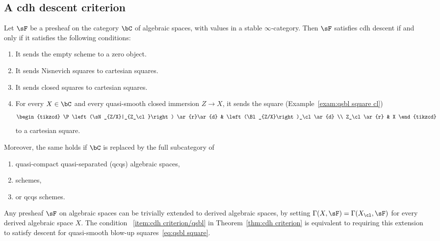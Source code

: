 \subsection{A cdh descent criterion}

\begin{theo}\label{thm:cdh criterion}
Let $\sF$ be a presheaf on the category $\bC$ of algebraic spaces, with values in a stable $\infty$-category. Then $\sF$ satisfies cdh descent if and only if it satisfies the following conditions:
\begin{enumerate}\romanenumi
\item\label{item:cdh criterion/reduced}
It sends the empty scheme to a zero object.
\item\label{item:cdh criterion/Nis}
It sends Nisnevich squares to cartesian squares.
\item\label{item:cdh criterion/closed}
It sends closed squares to cartesian squares.
\item\label{item:cdh criterion/qsbl}
For every $X\in\bC$ and every quasi-smooth closed immersion $Z \to X$, it sends the square (Example~\ref{exam:qsbl square cl})
\[
\begin{tikzcd}
\P\left(\sN_{Z/X}|_{Z_\cl}\right) \ar{r}\ar{d} & \left(\Bl_{Z/X}\right)_\cl \ar{d}
\\
Z_\cl \ar{r} & X
\end{tikzcd}
\]
to a cartesian square.
\end{enumerate} Moreover, the same holds if $\bC$ is replaced by the full subcategory of
\begin{enumerate}\alphenumi
\item quasi-compact quasi-separated (qcqs) algebraic spaces,
\item schemes,
\item or qcqs schemes.
\end{enumerate}
\end{theo}

\begin{rema}\label{rem:trivial extension to dass}
Any presheaf $\sF$ on algebraic spaces can be trivially extended to derived algebraic spaces, by setting $\Gamma(X, \sF) = \Gamma(X_\cl, \sF)$ for every derived algebraic space $X$. The condition~
\eqref{item:cdh criterion/qsbl} in Theorem~\ref{thm:cdh criterion} is equivalent to requiring this extension to satisfy descent for quasi-smooth blow-up squares~\eqref{eq:qsbl square}.
\end{rema}

